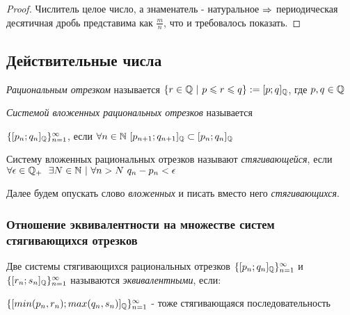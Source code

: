 \begin{proof}
    Числитель целое число, а знаменатель - натуральное $\Rightarrow$ периодическая десятичная дробь представима как $\frac{m}{n}$, что и требовалось показать.
\end{proof}

\subsection{Действительные числа}



\begin{definition}
    \textit{Рациональным отрезком} называется $\{r \in \mathbb{Q}\ |\ p \leqslant r \leqslant q\} := [p; q]_{\mathbb{Q}}$, где $p, q \in \mathbb{Q}$
\end{definition}

\begin{definition}
    \textit{Системой вложенных рациональных отрезков} называется 
    
    $\{[p_n;q_n]_{\mathbb{Q}}\}_{n = 1}^\infty$, если $\forall n \in \mathbb{N}\ [p_{n + 1}; q_{n + 1}]_{\mathbb{Q}} \subset [p_n; q_n]_{\mathbb{Q}}$
\end{definition}

\begin{definition}
    Систему вложенных рациональных отрезков называют \textit{стягивающейся}, если $\forall \epsilon \in \mathbb{Q}_+\ \ \exists N \in \mathbb{N}\ |\ \forall n > N\ q_n - p_n < \epsilon$
    
    Далее будем опускать слово \textit{вложенных} и писать вместо него \textit{стягивающихся}.
\end{definition}

\subsubsection*{Отношение эквивалентности на множестве систем стягивающихся отрезков}

\begin{definition}
    Две системы стягивающихся рациональных отрезков $\{[p_n; q_n]_{\mathbb{Q}}\}_{n = 1}^\infty$ и $\{[r_n; s_n]_{\mathbb{Q}}\}_{n = 1}^\infty$ называются \textit{эквивалентными}, если:
    
    $\{[min(p_n, r_n); max(q_n, s_n)]_{\mathbb{Q}}\}_{n = 1}^\infty$ - тоже стягивающаяся последовательность
\end{definition}

